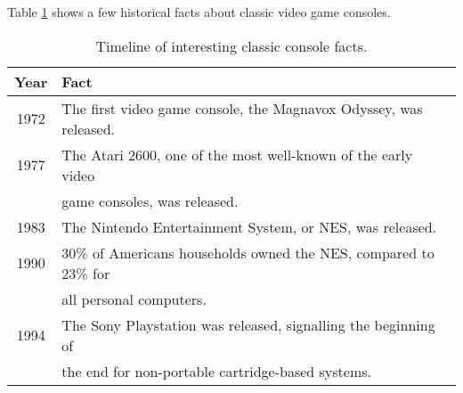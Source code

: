 \documentclass{article}
\begin{document}
Table \ref{table1} shows a few historical facts about classic video game consoles.
\begin{table}
\centering
\caption{Timeline of interesting classic console facts.}
\label{table1}
\begin{tabular}{cl}
\hline
Year & Fact \\
\hline
1972 & The first video game console, the Magnavox Odyssey, was released. \\
1977 & The Atari 2600, one of the most well-known of the early video \\
& game consoles, was released. \\
1983 & The Nintendo Entertainment System, or NES, was released. \\
1990 & 30\% of Americans households owned the NES, compared to 23\% for \\
& all personal computers. \\
1994 & The Sony Playstation was released, signalling the beginning of \\
& the end for non-portable cartridge-based systems. \\
\hline
\end{tabular}
\end{table}
\end{document}
